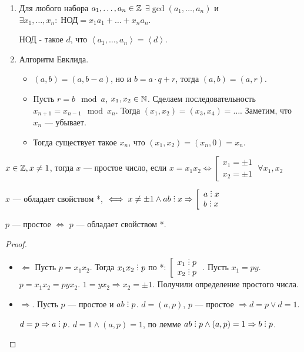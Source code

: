 \begin{enumerate}
    \item Для любого набора $a_1, \ldots, a_n \in \mathbb{Z}$ $\exists \gcd(a_1,\ldots,a_n)$ и $\exists x_1,\ldots,x_n: \; \text{НОД} = x_1a_1 + \ldots + x_n a_n$. 

        НОД - такое $d$, что  $\left< a_1,\ldots,a_n \right> = \left<d\right>$.
    \item Алгоритм Евклида. 
        \begin{itemize}
            \item $(a, b) = (a, b - a)$, но и  $b = a \cdot q + r$, тогда  $(a, b) = (a, r)$.
            
            \item Пусть $r = b \mod a$,  $x_1,x_2 \in \mathbb{N}$. Сделаем последовательность $x_{n+1} = x_{n - 1} \mod x_{n}$. Тогда  $(x_1, x_2) = (x_3, x_4) = \ldots$. Заметим, что $x_n$ --- убывает.

            \item Тогда существует такое  $x_n$, что  $(x_1, x_2) = (x_n, 0) = x_n$.
        \end{itemize}
\end{enumerate}
\begin{definition}
    $x \in \mathbb{Z}, x \neq 1$, тогда  $x$ --- простое число, если $x = x_1x_2 \iff \left[ \begin{array}{l} x_1 = \pm 1 \\ x_2 = \pm 1 \end{array} \right. \; \forall x_1, x_2$
\end{definition}
\begin{property}[*]
    $x$ --- обладает свойством  *, $\iff x \neq \pm 1 \land ab \divby x \Rightarrow \left[ \begin{array}{l} a \divby x \\ b \divby x \end{array} \right.$ 
\end{property}
\begin{statement}
    $p$ --- простое  $\iff$ $p$ --- обладает свойством *. \\
\end{statement}
\begin{proof}
    \slashn
     \begin{itemize}
         \item $\Leftarrow$ Пусть $p = x_1x_2$. Тогда $x_1x_2 \divby p$ по *: $\left[ \begin{array}{l} x_1 \divby p \\ x_2 \divby p \end{array} \right.$. Пусть $x_1 = py$. $p = x_1x_2 = pyx_2$. $1 = yx_2 \Rightarrow x_2 = \pm 1$. Получили определение простого числа.
             \item $\Rightarrow$. Пусть  $p$ --- простое и  $ab \divby p$.  $d = (a, p)$, $p$ --- простое  $\Rightarrow d = p \lor d = 1$.

                 $d = p \Rightarrow a \divby p$. $d = 1 \land (a, p) = 1$, по лемме  $ab \divby p \land (a,p) = 1 \Rightarrow b \divby p$.
     \end{itemize}
\end{proof}
